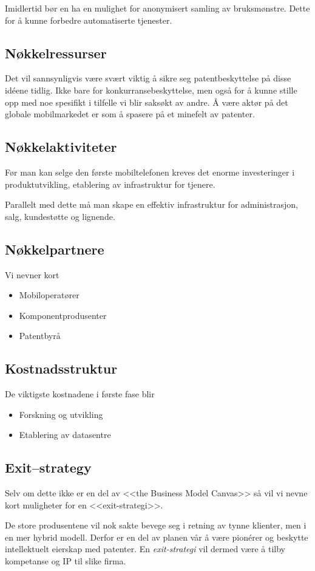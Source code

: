 Imidlertid bør en ha en mulighet for anonymisert samling av bruksmønstre. Dette
for å kunne forbedre automatiserte tjenester.

\subsection{Nøkkelressurser}

Det vil sannsynligvis være svært viktig å sikre seg patentbeskyttelse på disse
idéene tidlig. Ikke bare for konkurransebeskyttelse, men også for å kunne
stille opp med noe spesifikt i tilfelle vi blir saksøkt av andre. Å være aktør
på det globale mobilmarkedet er som å spasere på et minefelt av patenter.

\subsection{Nøkkelaktiviteter}

Før man kan selge den første mobiltelefonen kreves det enorme investeringer i
produktutvikling, etablering av infrastruktur for tjenere.

Parallelt med dette må man skape en effektiv infrastruktur for administrasjon,
salg, kundestøtte og lignende.

\subsection{Nøkkelpartnere}

Vi nevner kort

\begin{itemize}
  \item Mobiloperatører
  \item Komponentprodusenter
  \item Patentbyrå
\end{itemize}

\subsection{Kostnadsstruktur}

De viktigste kostnadene i første fase blir

\begin{itemize}
  \item Forskning og utvikling
  \item Etablering av datasentre
\end{itemize}


\subsection{Exit--strategy}

Selv om dette ikke er en del av <<the Business Model Canvas>> så vil vi nevne
kort muligheter for en <<exit-strategi>>.

De store produsentene vil nok sakte bevege seg i retning av tynne klienter, men
i en mer hybrid modell.  Derfor er en del av planen vår å være pionérer og
beskytte intellektuelt eierskap med patenter.  En \textit{exit-strategi} vil
dermed være å tilby kompetanse og IP til slike firma.
